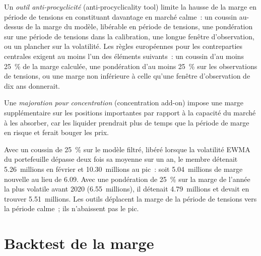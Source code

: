 \begin{definition}\label{def:rc:margin-models:apc}
Un \emph{outil anti-procyclicité} (anti-procyclicality tool) limite la hausse de la marge en période de tensions
en constituant davantage en marché calme~: un coussin au-dessus de la marge du modèle, libérable en période de tensions, une
pondération sur une période de tensions dans la calibration, une longue fenêtre d'observation, ou un plancher sur la volatilité.
Les règles européennes pour les contreparties centrales exigent au moins l'un des éléments suivants~: un coussin d'au moins 25~\% de la
marge calculée, une pondération d'au moins 25~\% sur les observations de tensions, ou une marge non inférieure à
celle qu'une fenêtre d'observation de dix ans donnerait.
\end{definition}

\begin{definition}\label{def:rc:margin-models:conc}
Une \emph{majoration pour concentration} (concentration add-on) impose une marge supplémentaire sur les positions importantes
par rapport à la capacité du marché à les absorber, car les liquider prendrait plus de temps que la
période de marge en risque et ferait bouger les prix.
\end{definition}

\label{lst:rc:margin-models:apc}

\begin{example}\label{ex:rc:margin-models:apc}
Avec un coussin de 25~\% sur le modèle filtré, libéré lorsque la volatilité EWMA du portefeuille dépasse deux fois sa
moyenne sur un an, le membre détenait 5.26~millions en février et 10.30~millions au pic~: soit 5.04~millions
de marge nouvelle au lieu de 6.09. Avec une pondération de 25~\% sur la marge de l'année la plus volatile avant 2020
(6.55~millions), il détenait 4.79~millions et devait en trouver 5.51~millions. Les outils déplacent la marge de la période de tensions
vers la période calme~; ils n'abaissent pas le pic.
\end{example}

\section{Backtest de la marge}

